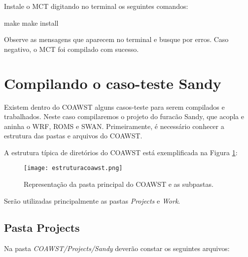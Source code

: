 \noindent Instale o MCT digitando no terminal os seguintes comandos:
\bigskip

\begin{bashcode}
make
make install
\end{bashcode}
\bigskip
\noindent Observe as mensagens que aparecem no terminal e busque por erros. Caso negativo, o MCT foi compilado com sucesso.
\bigskip


\section{Compilando o caso-teste Sandy}
\bigskip

\noindent Existem dentro do COAWST alguns casos-teste para serem compilados e trabalhados. Neste caso compilaremos o projeto do furacão Sandy, que acopla e aninha o WRF, ROMS e SWAN. Primeiramente, é necessário conhecer a estrutura das pastas e arquivos do COAWST.
\bigskip

\noindent A estrutura típica de diretórios do COAWST está exemplificada na Figura \textcolor{bleu_cite}{\ref{pastascoa}}:
\bigskip

\begin{figure}[H]
    \centering
    \texttt{[image: estruturacoawst.png]}
    \caption{Representação da pasta principal do COAWST e as subpastas.}
    \label{pastascoa}
\end{figure}
\bigskip

\noindent Serão utilizadas principalmente as pastas \textit{Projects} e \textit{Work}.

\subsection{Pasta Projects}
\bigskip

\noindent Na pasta \textit{COAWST/Projects/Sandy} deverão constar os seguintes arquivos:
\bigskip

